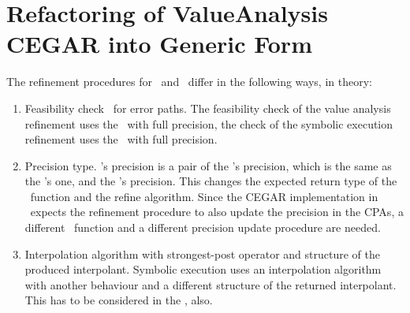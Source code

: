\section{Refactoring of ValueAnalysis CEGAR into Generic Form}
The refinement procedures for \ and \symbolicExecutionCPA\ differ in the following ways, in theory:
\begin{enumerate}
\item
Feasibility check \isFeasibleFunc\ for error paths.
The feasibility check of the value analysis refinement uses the \ with full precision, the check of the symbolic execution refinement uses the \symbolicExecutionCPA\ with full precision.

\item
Precision type. \SymbolicExecutionCPA's precision is a pair of the \symbolicValueAnalysisCPA's precision, which is the same as the 's one, and the \constraintsCPA's precision. This changes the expected return type of the \extractPrecisionFunc\ function and the refine algorithm.
Since the CEGAR implementation in \cpaChecker\ expects the refinement procedure to also update the precision in the CPAs, a different \extractPrecisionFunc\ function and a different
precision update procedure are needed.

\item
Interpolation algorithm with strongest-post operator and structure of the produced interpolant.
Symbolic execution uses an interpolation algorithm with another behaviour and a different structure of the returned interpolant.
This has to be considered in the \extractPrecisionFunc, also.
\end{enumerate}

